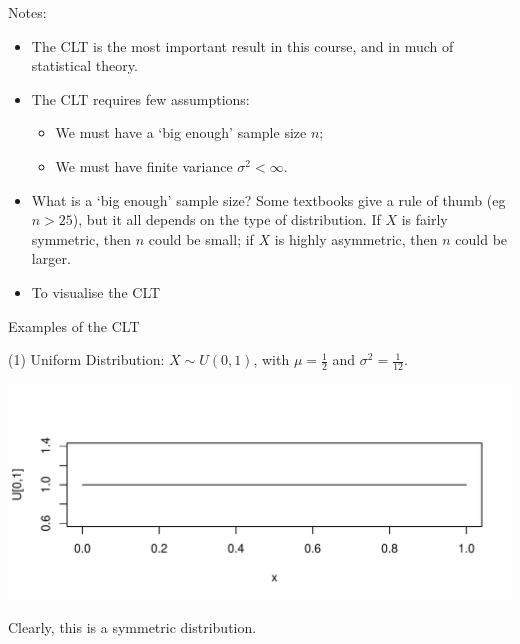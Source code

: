 \documentclass[t,xcolor=pdftex,dvipsnames,table]{beamer}
\makeatletter
\def\maxwidth{ %
  \ifdim\Gin@nat@width>\linewidth
    \linewidth
  \else
    \Gin@nat@width
  \fi
}
\newenvironment{knitrout}{}{} %
\makeatother
\begin{document}
\begin{frame}{}

Notes:
\begin{itemize}
\item
The CLT is the most important result in this course, and in much of statistical theory.
\item
The CLT requires few assumptions:\\
\begin{itemize}
\item We must have a `big enough' sample size $n$; \\
\item
We must have finite variance $\sigma^2< \infty$.
\end{itemize}

\item 
What is a `big enough' sample size? Some textbooks give a rule of thumb (eg $n > 25$), but it all depends on the type of distribution. If $X$ is fairly symmetric, then $n$ could be small; if $X$ is highly asymmetric, then $n$ could be larger.

\item To visualise the CLT
\href{http://www.lock5stat.com/statkey/sampling_1_quant/sampling_1_quant.html}{}
\href{http://onlinestatbook.com/stat_sim/sampling_dist/}{}
\end{itemize}
\end{frame}


\begin{frame}{Examples of the CLT}

(1) Uniform Distribution: $X \sim U(0,1)$, with $\mu = \frac{1}{2}$ and $\sigma^2=\frac{1}{12}$.  

\begin{knitrout}
\color{fgcolor}
\includegraphics[width=\maxwidth]{figure/unnamed-chunk-4-1} 

\end{knitrout}


Clearly, this is a symmetric distribution.

\end{frame}
\end{document}
